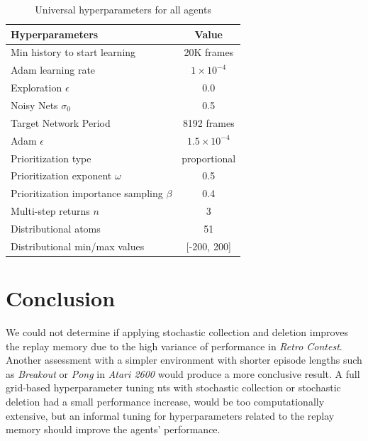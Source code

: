 \documentclass{article} %
\begin{document}
\begin{table}[!htbp]
  \centering
  \begin{tabular}{ l c }
    \hline
    Hyperparameters                            & Value                \\ \hline
    Min history to start learning              & 20K frames           \\
    Adam learning rate                         & $1 \times 10^{-4}$   \\
    Exploration $\epsilon$                     & 0.0                  \\
    Noisy Nets $\sigma_0$                      & 0.5                  \\
    Target Network Period                      & 8192 frames          \\
    Adam $\epsilon$                            & $1.5 \times 10^{-4}$ \\
    Prioritization type                        & proportional         \\
    Prioritization exponent $\omega$           & 0.5                  \\
    Prioritization importance sampling $\beta$ & 0.4                  \\
    Multi-step returns $n$                     & 3                    \\
    Distributional atoms                       & 51                   \\
    Distributional min/max values              & [-200, 200]
  \end{tabular}
  \caption{Universal hyperparameters for all agents}
  \label{table:hyperparameters}
\end{table}




\section{Conclusion}
We could not determine if applying stochastic collection and deletion improves the replay memory due to the high variance of performance in \textit{Retro Contest}. Another assessment with a simpler environment with shorter episode lengths such as \textit{Breakout} or \textit{Pong} in \textit{Atari 2600} would produce a more conclusive result. A full grid-based hyperparameter tuning nts with stochastic collection or stochastic deletion had a small performance increase, would be too computationally extensive, but an informal tuning for hyperparameters related to the replay memory should improve the agents' performance.
\end{document}
